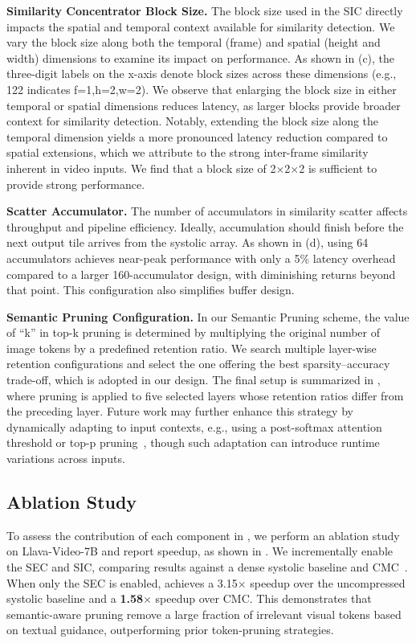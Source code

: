 {\textbf{Similarity Concentrator Block Size.}
The block size used in the SIC directly impacts the spatial and temporal context available for similarity detection. 
{We vary the block size along both the temporal (frame) and spatial (height and width) dimensions to examine its impact on performance.}
{As shown in (c), the three-digit labels on the x-axis denote block sizes across these dimensions (e.g., 122 indicates f=1,h=2,w=2). We observe that enlarging the block size in either temporal or spatial dimensions reduces latency, as larger blocks provide broader context for similarity detection.}
{Notably, extending the block size along the temporal dimension yields a more pronounced latency reduction compared to spatial extensions, which we attribute to the strong inter-frame similarity inherent in video inputs.}
We find that a block size of 2×2×2 is sufficient to provide strong performance. 

\textbf{Scatter Accumulator.}
The number of accumulators in similarity scatter affects throughput and pipeline efficiency. Ideally, accumulation should finish before the next output tile arrives from the systolic array.
As shown in (d), using 64 accumulators achieves near-peak performance with only a 5\% latency overhead compared to a larger 160-accumulator design, with diminishing returns beyond that point. 
This configuration also simplifies buffer design.

{\textbf{Semantic Pruning Configuration.}
In our Semantic Pruning scheme, the value of “k” in top-k pruning is determined by multiplying the original number of image tokens by a predefined retention ratio. We search multiple layer-wise retention configurations and select the one offering the best sparsity–accuracy trade-off, which is adopted in our design. The final setup is summarized in , where pruning is applied to five selected layers whose retention ratios differ from the preceding layer.
Future work may further enhance this strategy by dynamically adapting to input contexts, e.g., using a post-softmax attention threshold or top-p pruning~\cite{lin2025twilight}, though such adaptation can introduce runtime variations across inputs.
}

\subsection{Ablation Study}

{To assess the contribution of each component in \proj, we perform an ablation study on Llava-Video-7B and report speedup, as shown in . We incrementally enable the SEC and SIC, comparing results against a dense systolic baseline and CMC~\cite{song2024cmc}.
When only the SEC is enabled, \proj{} achieves a 3.15$\times$ speedup over the uncompressed systolic baseline and a \textbf{1.58$\times$} speedup over CMC. This demonstrates that semantic-aware pruning remove a large fraction of irrelevant visual tokens based on textual guidance, outperforming prior token-pruning strategies.

}}
